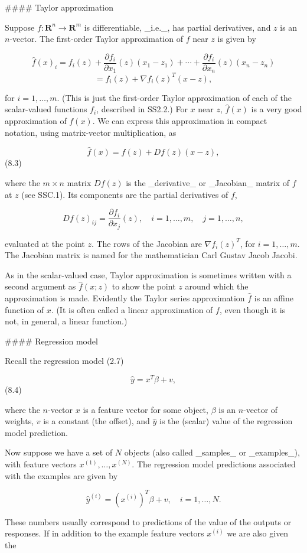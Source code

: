 

#### Taylor approximation

Suppose \(f:\mathbf{R}^{n}\to\mathbf{R}^{m}\) is differentiable, _i.e._, has partial derivatives, and \(z\) is an \(n\)-vector. The first-order Taylor approximation of \(f\) near \(z\) is given by

\[\hat{f}(x)_{i} = f_{i}(z)+\frac{\partial f_{i}}{\partial x_{1}}(z)(x_{1}-z_{1})+ \cdots+\frac{\partial f_{i}}{\partial x_{n}}(z)(x_{n}-z_{n})\] \[= f_{i}(z)+\nabla f_{i}(z)^{T}(x-z),\]

for \(i=1,\ldots,m\). (This is just the first-order Taylor approximation of each of the scalar-valued functions \(f_{i}\), described in SS2.2.) For \(x\) near \(z\), \(\hat{f}(x)\) is a very good approximation of \(f(x)\). We can express this approximation in compact notation, using matrix-vector multiplication, as

\[\hat{f}(x)=f(z)+Df(z)(x-z),\] (8.3)

where the \(m\times n\) matrix \(Df(z)\) is the _derivative_ or _Jacobian_ matrix of \(f\) at \(z\) (see SSC.1). Its components are the partial derivatives of \(f\),

\[Df(z)_{ij}=\frac{\partial f_{i}}{\partial x_{j}}(z),\quad i=1,\ldots,m,\quad j =1,\ldots,n,\]

evaluated at the point \(z\). The rows of the Jacobian are \(\nabla f_{i}(z)^{T}\), for \(i=1,\ldots,m\). The Jacobian matrix is named for the mathematician Carl Gustav Jacob Jacobi.

As in the scalar-valued case, Taylor approximation is sometimes written with a second argument as \(\hat{f}(x;z)\) to show the point \(z\) around which the approximation is made. Evidently the Taylor series approximation \(\hat{f}\) is an affine function of \(x\). (It is often called a linear approximation of \(f\), even though it is not, in general, a linear function.)

#### Regression model

Recall the regression model (2.7)

\[\hat{y}=x^{T}\beta+v,\] (8.4)

where the \(n\)-vector \(x\) is a feature vector for some object, \(\beta\) is an \(n\)-vector of weights, \(v\) is a constant (the offset), and \(\hat{y}\) is the (scalar) value of the regression model prediction.

Now suppose we have a set of \(N\) objects (also called _samples_ or _examples_), with feature vectors \(x^{(1)},\ldots,x^{(N)}\). The regression model predictions associated with the examples are given by

\[\hat{y}^{(i)}=(x^{(i)})^{T}\beta+v,\quad i=1,\ldots,N.\]

These numbers usually correspond to predictions of the value of the outputs or responses. If in addition to the example feature vectors \(x^{(i)}\) we are also given the